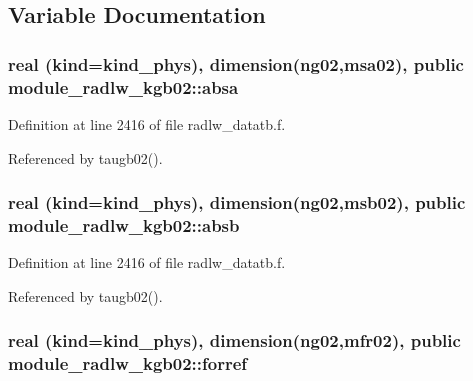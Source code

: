 \subsection{Variable Documentation}
\subsubsection[{\texorpdfstring{absa}{absa}}]{\setlength{\rightskip}{0pt plus 5cm}real (kind=kind\+\_\+phys), dimension(ng02,{\bf msa02}), public module\+\_\+radlw\+\_\+kgb02\+::absa}\hypertarget{namespacemodule__radlw__kgb02_a46db893d4456b2d867130bb208cb2206}{}\label{namespacemodule__radlw__kgb02_a46db893d4456b2d867130bb208cb2206}


Definition at line 2416 of file radlw\+\_\+datatb.\+f.



Referenced by taugb02().

\subsubsection[{\texorpdfstring{absb}{absb}}]{\setlength{\rightskip}{0pt plus 5cm}real (kind=kind\+\_\+phys), dimension(ng02,{\bf msb02}), public module\+\_\+radlw\+\_\+kgb02\+::absb}\hypertarget{namespacemodule__radlw__kgb02_acf34f9255586c9ed5ac5370db5b63c14}{}\label{namespacemodule__radlw__kgb02_acf34f9255586c9ed5ac5370db5b63c14}


Definition at line 2416 of file radlw\+\_\+datatb.\+f.



Referenced by taugb02().

\subsubsection[{\texorpdfstring{forref}{forref}}]{\setlength{\rightskip}{0pt plus 5cm}real (kind=kind\+\_\+phys), dimension(ng02,{\bf mfr02}), public module\+\_\+radlw\+\_\+kgb02\+::forref}\hypertarget{namespacemodule__radlw__kgb02_af6f3d7a0ab6858eab9d4d3e2d2d68031}{}\label{namespacemodule__radlw__kgb02_af6f3d7a0ab6858eab9d4d3e2d2d68031}


